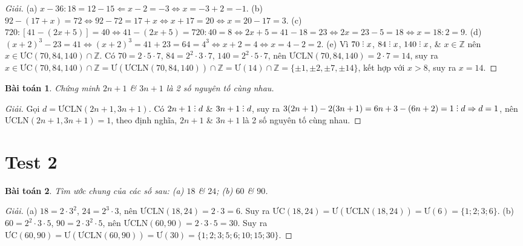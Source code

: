 \documentclass[11pt]{article}
\numberwithin{equation}{section}
\newtheorem{baitoan}{Bài toán}[section]
\DeclareRobustCommand{\divby}{%
	\mathrel{\vbox{\baselineskip.65ex\lineskiplimit0pt\hbox{.}\hbox{.}\hbox{.}}}%
}
\begin{document}
\begin{proof}[Giải]
	(a) $x - 36:18 = 12 - 15\Leftarrow x - 2 = -3\Leftrightarrow x = -3 + 2 = -1$. (b) $92 - (17 + x) = 72\Leftrightarrow 92 - 72 = 17 + x\Leftrightarrow x + 17 = 20\Leftrightarrow x = 20 - 17 = 3$. (c) $720:[41 - (2x + 5)] = 40\Leftrightarrow 41 - (2x + 5) = 720:40 = 8\Leftrightarrow 2x + 5 = 41 - 18 = 23\Leftrightarrow 2x = 23 - 5 = 18\Leftrightarrow x = 18:2 = 9$. (d) $(x + 2)^3 - 23 = 41\Leftrightarrow(x + 2)^3 = 41 + 23 = 64 = 4^3\Leftrightarrow x + 2 = 4\Leftrightarrow x = 4 - 2 = 2$. (e) Vì $70\divby x$, $84\divby x$, $140\divby x$, \& $x\in\mathbb{Z}$ nên $x\in\mbox{ƯC}(70,84,140)\cap\mathbb{Z}$. Có $70 = 2\cdot5\cdot7$, $84 = 2^2\cdot3\cdot7$, $140 = 2^2\cdot5\cdot7$, nên $\mbox{ƯCLN}(70,84,140) = 2\cdot7 = 14$, suy ra $x\in\mbox{ƯC}(70,84,140)\cap\mathbb{Z} = \mbox{Ư}(\mbox{ƯCLN}(70,84,140))\cap\mathbb{Z} = \mbox{Ư}(14)\cap\mathbb{Z} = \{\pm1,\pm2,\pm7,\pm14\}$, kết hợp với $x > 8$, suy ra $x = 14$.
\end{proof}

\begin{baitoan}
	Chứng minh $2n + 1$ \& $3n + 1$ là 2 số nguyên tố cùng nhau.
\end{baitoan}

\begin{proof}[Giải]
	Gọi $d = \mbox{ƯCLN}(2n + 1,3n + 1)$. Có $2n + 1\divby d$ \& $3n + 1\divby d$, suy ra $3(2n + 1) - 2(3n + 1) = 6n + 3 - (6n + 2) = 1\divby d\Rightarrow d = 1$, nên $\mbox{ƯCLN}(2n + 1,3n + 1) = 1$, theo định nghĩa, $2n + 1$ \& $3n + 1$ là 2 số nguyên tố cùng nhau.
\end{proof}


\section{Test 2}

\begin{baitoan}
	Tìm ước chung của các số sau: (a) $18$ \& $24$; (b) $60$ \& $90$.
\end{baitoan}

\begin{proof}[Giải]
	(a) $18 = 2\cdot3^2$, $24 = 2^3\cdot3$, nên $\mbox{ƯCLN}(18,24) = 2\cdot3 = 6$. Suy ra $\mbox{ƯC}(18,24) = \mbox{Ư}(\mbox{ƯCLN}(18,24)) = \mbox{Ư}(6) = \{1;2;3;6\}$. (b) $60 = 2^2\cdot3\cdot5$, $90 = 2\cdot3^2\cdot5$, nên $\mbox{ƯCLN}(60,90) = 2\cdot3\cdot5 = 30$. Suy ra $\mbox{ƯC}(60,90) = \mbox{Ư}(\mbox{ƯCLN}(60,90)) = \mbox{Ư}(30) = \{1;2;3;5;6;10;15;30\}$.
\end{proof}
\end{document}
